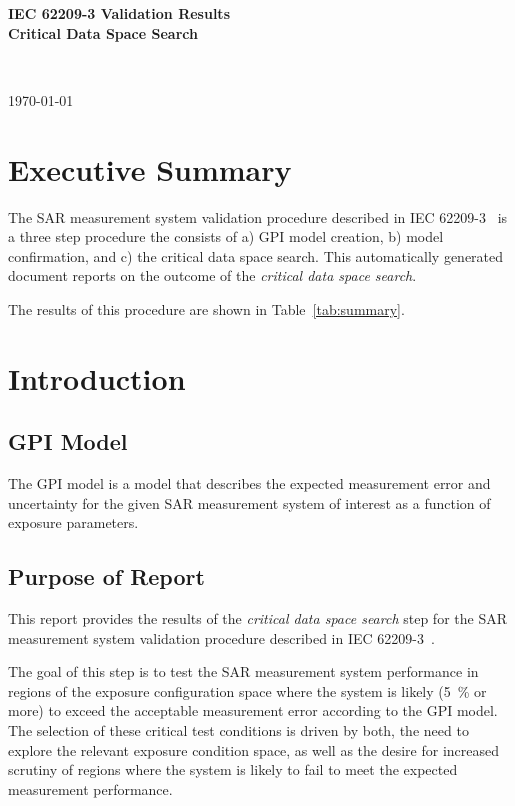 \documentclass{article}
\begin{document}
\flushright
\begin{Large}
\textbf{IEC 62209-3 Validation Results} \\
\vspace{3pt}
\textbf{Critical Data Space Search}
\end{Large} \\
\begin{small}
\today \\ \currenttime
\end{small}
\flushleft

\section{Executive Summary}\label{sec:exec_summary}
The SAR measurement system validation procedure described in IEC 62209-3~\cite{standard} is a three step procedure the consists of a) GPI model creation, b) model confirmation, and c) the critical data space search. This automatically generated document reports on the outcome of the \textit{critical data space search}.



The results of this procedure are shown in Table~\ref{tab:summary}.





\section{Introduction}\label{sec:start}
\subsection{GPI Model}
The GPI model is a model that describes the expected measurement error and uncertainty for the given SAR measurement system of interest as a function of exposure parameters.

\subsection{Purpose of Report}\label{sec:intro}
This report provides the results of the \textit{critical data space search} step for the SAR measurement system validation procedure described in IEC 62209-3~\cite{standard}.

The goal of this step is to test the SAR measurement system performance in regions of the exposure configuration space where the system is likely (5~\% or more) to exceed the acceptable measurement error according to the GPI model. The selection of these critical test conditions is driven by both, the need to explore the relevant exposure condition space, as well as the desire for increased scrutiny of regions where the system is likely to fail to meet the expected measurement performance.
\end{document}
